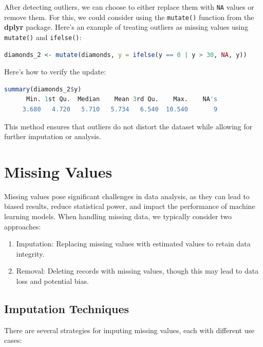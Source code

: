 \documentclass[
]{book}
\newcommand{\passthrough}[1]{#1}
\providecommand{\tightlist}{%
  \setlength{\itemsep}{0pt}\setlength{\parskip}{0pt}}
\theoremstyle{definition}
\theoremstyle{definition}
\theoremstyle{definition}
\theoremstyle{definition}
\theoremstyle{remark}
\begin{document}
After detecting outliers, we can choose to either replace them with \passthrough{\lstinline!NA!} values or remove them. For this, we could consider using the \passthrough{\lstinline!mutate()!} function from the \textbf{dplyr} package. Here's an example of treating outliers as missing values using \passthrough{\lstinline!mutate()!} and \passthrough{\lstinline!ifelse()!}:

\begin{lstlisting}[language=R]
diamonds_2 <- mutate(diamonds, y = ifelse(y == 0 | y > 30, NA, y))
\end{lstlisting}

Here's how to verify the update:

\begin{lstlisting}[language=R]
summary(diamonds_2$y)
      Min. 1st Qu.  Median    Mean 3rd Qu.    Max.    NA's 
     3.680   4.720   5.710   5.734   6.540  10.540       9
\end{lstlisting}

This method ensures that outliers do not distort the dataset while allowing for further imputation or analysis.

\section{Missing Values}\label{missing-values}

Missing values pose significant challenges in data analysis, as they can lead to biased results, reduce statistical power, and impact the performance of machine learning models. When handling missing data, we typically consider two approaches:

\begin{enumerate}
\def\labelenumi{\arabic{enumi}.}
\tightlist
\item
  Imputation: Replacing missing values with estimated values to retain data integrity.\\
\item
  Removal: Deleting records with missing values, though this may lead to data loss and potential bias.
\end{enumerate}

\subsection*{Imputation Techniques}\label{imputation-techniques}

There are several strategies for imputing missing values, each with different use cases:
\end{document}

